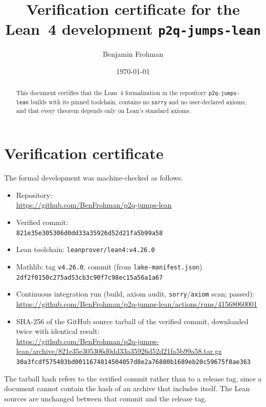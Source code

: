 \documentclass[11pt]{amsart}
\title{Verification certificate for the Lean~4 development \texttt{p2q-jumps-lean}}
\author{Benjamin Frohman}
\date{\today}
\begin{document}
\begin{abstract}
This document certifies that the Lean~4 formalization in the repository \texttt{p2q-jumps-lean} builds with its pinned toolchain, contains no \texttt{sorry} and no user-declared axioms, and that every theorem depends only on Lean's standard axioms.
\end{abstract}
\maketitle
\section{Verification certificate}

The formal development was machine-checked as follows.

{\raggedright
\begin{itemize}
\item Repository:\\ {\footnotesize\url{https://github.com/BenFrohman/p2q-jumps-lean}}
\item Verified commit:\\ {\footnotesize\texttt{821e35e305306d0dd33a35926d52d21fa5b99a58}}
\item Lean toolchain: \texttt{leanprover/lean4:v4.26.0}
\item Mathlib: tag \texttt{v4.26.0}, commit (from \texttt{lake-manifest.json})\\ {\footnotesize\texttt{2df2f0150c275ad53cb3c90f7c98ec15a56a1a67}}
\item Continuous integration run (build, axiom audit, \texttt{sorry}/\texttt{axiom} scan; passed):\\ {\footnotesize\url{https://github.com/BenFrohman/p2q-jumps-lean/actions/runs/41568060001}}
\item SHA-256 of the GitHub source tarball of the verified commit, downloaded twice with identical result:\\ {\footnotesize\url{https://github.com/BenFrohman/p2q-jumps-lean/archive/821e35e305306d0dd33a35926d52d21fa5b99a58.tar.gz}}\\
{\footnotesize\texttt{30a3fcdf575403bd0011674814504057d8e2a76880b1689eb20c59675f8ae363}}
\end{itemize}\par}

The tarball hash refers to the verified commit rather than to a release tag, since a document cannot contain the hash of an archive that includes itself. The Lean sources are unchanged between that commit and the release tag.
\end{document}
